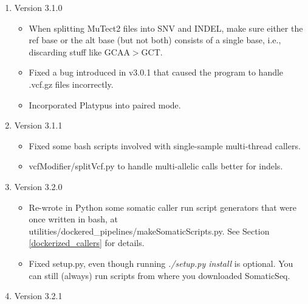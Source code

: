 \documentclass[10pt,letterpaper]{article}
\begin{document}
\begin{sloppypar}
\begin{enumerate}
\begin{itemize}
		\end{itemize}
	


	\item Version 3.1.0
		\begin{itemize}
		
		  \item
		  When splitting MuTect2 files into SNV and INDEL, make sure either the ref base or the alt base (but not both) consists of a single base, i.e., discarding stuff like GCAA$>$GCT.
		  
		  \item
		  Fixed a bug introduced in v3.0.1 that caused the program to handle .vcf.gz files incorrectly.
		  
          \item
          Incorporated Platypus into paired mode.
		  
		\end{itemize}

		
    \item Version 3.1.1
        \begin{itemize}
         
         \item 
         Fixed some bash scripts involved with single-sample multi-thread callers.
         
         \item
         vcfModifier/splitVcf.py to handle multi-allelic calls better for indels. 
         
        \end{itemize}


	\item Version 3.2.0
        \begin{itemize}
         
         \item 
         Re-wrote in Python some somatic caller run script generators that were once written in bash, at utilities/dockered\_pipelines/makeSomaticScripts.py. See Section \ref{dockerized_callers} for details. 
         
         \item
         Fixed setup.py, even though running \textit{./setup.py install} is optional. You can still (always) run scripts from where you downloaded SomaticSeq. 
 
        \end{itemize}


	\item Version 3.2.1
	

\end{enumerate}
\end{sloppypar}
\end{document}
